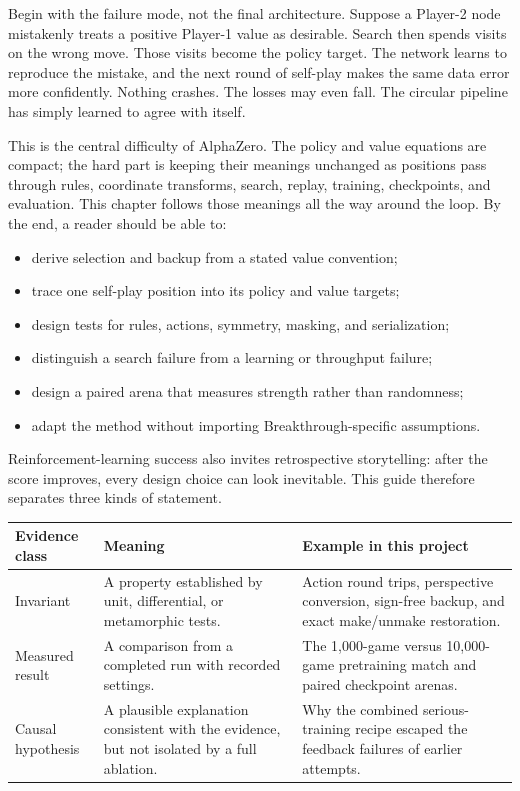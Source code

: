 \documentclass[10.5pt,letterpaper]{article}
\begin{document}
Begin with the failure mode, not the final architecture. Suppose a Player-2
node mistakenly treats a positive Player-1 value as desirable. Search then
spends visits on the wrong move. Those visits become the policy target. The
network learns to reproduce the mistake, and the next round of self-play makes
the same data error more confidently. Nothing crashes. The losses may even
fall. The circular pipeline has simply learned to agree with itself.

This is the central difficulty of AlphaZero. The policy and value equations are
compact; the hard part is keeping their meanings unchanged as positions pass
through rules, coordinate transforms, search, replay, training, checkpoints,
and evaluation. This chapter follows those meanings all the way around the
loop. By the end, a reader should be able to:

\begin{itemize}
  \item derive selection and backup from a stated value convention;
  \item trace one self-play position into its policy and value targets;
  \item design tests for rules, actions, symmetry, masking, and serialization;
  \item distinguish a search failure from a learning or throughput failure;
  \item design a paired arena that measures strength rather than randomness;
  \item adapt the method without importing Breakthrough-specific assumptions.
\end{itemize}

Reinforcement-learning success also invites retrospective storytelling: after
the score improves, every design choice can look inevitable. This guide
therefore separates three kinds of statement.

\begin{center}
\small
\begin{tabularx}{\textwidth}{L{0.19\textwidth} Y Y}
\toprule
\sffamily\bfseries Evidence class &
\sffamily\bfseries Meaning &
\sffamily\bfseries Example in this project \\
\midrule
Invariant &
A property established by unit, differential, or metamorphic tests. &
Action round trips, perspective conversion, sign-free backup, and exact
make/unmake restoration. \\
Measured result &
A comparison from a completed run with recorded settings. &
The 1,000-game versus 10,000-game pretraining match and paired checkpoint
arenas. \\
Causal hypothesis &
A plausible explanation consistent with the evidence, but not isolated by a
full ablation. &
Why the combined serious-training recipe escaped the feedback failures of
earlier attempts. \\
\bottomrule
\end{tabularx}
\end{center}
\end{document}
